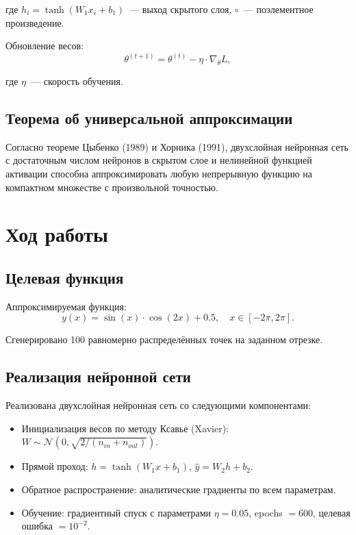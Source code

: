 \documentclass[14pt,a4paper]{extarticle}
\begin{document}
где $h_i = \tanh(W_1 x_i + b_1)$~--- выход скрытого слоя, $\circ$~--- поэлементное произведение.

Обновление весов:
\begin{equation}
\theta^{(t+1)} = \theta^{(t)} - \eta \cdot \nabla_\theta L,
\end{equation}

где $\eta$~--- скорость обучения.

\subsection{Теорема об универсальной аппроксимации}

Согласно теореме Цыбенко (1989) и Хорника (1991), двухслойная нейронная сеть с достаточным числом нейронов в скрытом слое и нелинейной функцией активации способна аппроксимировать любую непрерывную функцию на компактном множестве с произвольной точностью.

\section{Ход работы}

\subsection{Целевая функция}

Аппроксимируемая функция:
\begin{equation}
y(x) = \sin(x) \cdot \cos(2x) + 0.5, \quad x \in [-2\pi, 2\pi].
\end{equation}

Сгенерировано 100 равномерно распределённых точек на заданном отрезке.

\subsection{Реализация нейронной сети}

Реализована двухслойная нейронная сеть со следующими компонентами:
\begin{itemize}
\item Инициализация весов по методу Ксавье (Xavier): $W \sim \mathcal{N}(0, \sqrt{2/(n_{in}+n_{out})})$.
\item Прямой проход: $h = \tanh(W_1 x + b_1)$, $\hat{y} = W_2 h + b_2$.
\item Обратное распространение: аналитические градиенты по всем параметрам.
\item Обучение: градиентный спуск с параметрами $\eta = 0.05$, epochs $= 600$, целевая ошибка $= 10^{-2}$.
\end{itemize}
\end{document}
